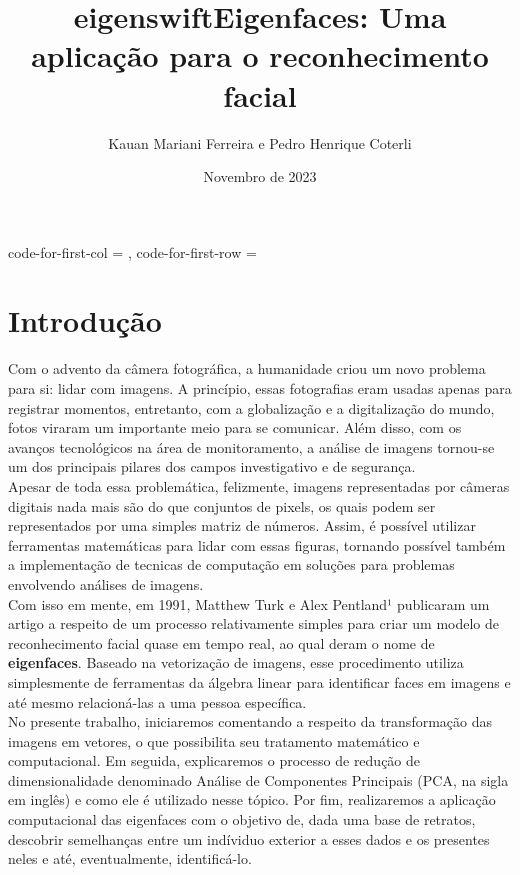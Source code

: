 \documentclass{article}
\title{eigenswift}
\title{Eigenfaces: Uma aplicação para o reconhecimento facial}
\author{Kauan Mariani Ferreira e Pedro Henrique Coterli}
\date{Novembro de 2023}
\begin{document}
\NiceMatrixOptions
  {
    code-for-first-col = \scriptstyle ,
    code-for-first-row = \scriptstyle 
  }

\maketitle

\section{Introdução}
Com o advento da câmera fotográfica, a humanidade criou um novo problema para si: lidar com imagens. A princípio, essas fotografias eram usadas apenas para registrar momentos, entretanto, com a globalização e a digitalização do mundo, fotos viraram um importante meio para se comunicar. Além disso, com os avanços tecnológicos na área de monitoramento, a análise de imagens tornou-se um dos principais pilares dos campos investigativo e de segurança.\\

Apesar de toda essa problemática, felizmente, imagens representadas por câmeras digitais nada mais são do que conjuntos de pixels, os quais podem ser representados por uma simples matriz de números. Assim, é possível utilizar ferramentas matemáticas para lidar com essas figuras, tornando possível também a implementação de tecnicas de computação em soluções para problemas envolvendo análises de imagens.\\

Com isso em mente, em 1991, Matthew Turk e Alex Pentland¹ publicaram um artigo a respeito de um processo relativamente simples para criar um modelo de reconhecimento facial quase em tempo real, ao qual deram o nome de \textbf{eigenfaces}. Baseado na vetorização de imagens, esse procedimento utiliza simplesmente de ferramentas da álgebra linear para identificar faces em imagens e até mesmo relacioná-las a uma pessoa específica.\\

No presente trabalho, iniciaremos comentando a respeito da transformação das imagens em vetores, o que possibilita seu tratamento matemático e computacional. Em seguida, explicaremos o processo de redução de dimensionalidade denominado Análise de Componentes Principais (PCA, na sigla em inglês) e como ele é utilizado nesse tópico. Por fim, realizaremos a aplicação computacional das eigenfaces com o objetivo de, dada uma base de retratos, descobrir semelhanças entre um indíviduo exterior a esses dados e os presentes neles e até, eventualmente, identificá-lo.\\
\end{document}

